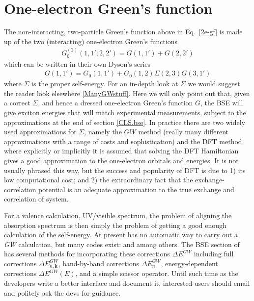 \documentclass[11pt]{report}
\begin{document}
\section{One-electron Green's function}

The non-interacting, two-particle Green's function above in Eq.~\ref{2e-gf} is made up of the two (interacting) one-electron Green's functions
\begin{align}
G_0^{(2)}(1,1';2,2') = G(1,1') + G(2,2') 
\end{align}
which can be written in their own Dyson's series
\begin{align} 
G(1,1') = G_0(1,1') + G_0(1,2) \Sigma(2,3) G(3,1')
\end{align}
where $\Sigma$ is the proper self-energy.
For an in-depth look at $\Sigma$ we would suggest the reader look elsewhere \ref{ManyGWstuff}.
Here we will only point out that, given a correct $\Sigma$, and hence a dressed one-electron Green's function $G$, the BSE will give exciton energies that will match experimental measurements, subject to the approximations at the end of section \ref{CLS.bse}. 
In practice there are two widely used approximations for $\Sigma$, namely the $GW$ method (really many different approximations with a range of costs and sophistication) and the DFT method where explicitly or implicitly it is assumed that solving the DFT Hamiltonian gives a good approximation to the one-electron orbitals and energies.
It is not usually phrased this way, but the success and popularity of DFT is due to 1) its low computational cost; and 2) the extraordinary fact that the exchange-correlation potential is an adequate approximation to the true exchange and correlation of system. 

For a valence calculation, UV/visible spectrum, the problem of aligning the absorption spectrum is then simply the problem of getting a good enough calculation of the self-energy. 
At present  has no automatic way to carry out a {\it GW} calculation, but many codes exist:  and  among others. 
The BSE section of  has several methods for incorporating these corrections $\Delta E^{\textit{GW}}$ including full corrections $\Delta E^{\textit{GW}}_{n,\mathbf{k}}$, band-by-band corrections 
$\Delta E^{\textit{GW}}_{n}$, energy-dependent corrections $\Delta E^{\textit{GW}}(E)$, and a simple scissor operator.
Until such time as the developers write a better interface and document it, interested users should email and politely ask the devs for guidance. 
\end{document}
